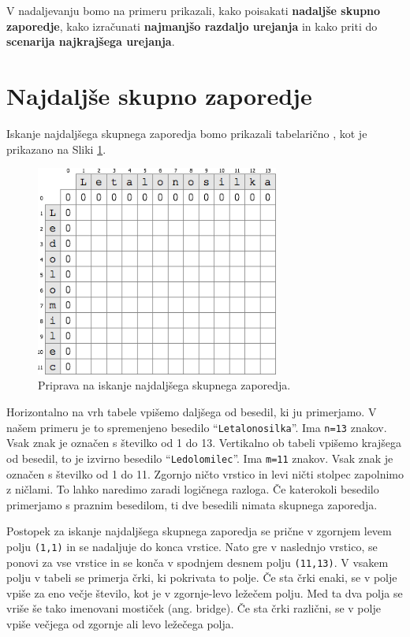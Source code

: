 \documentclass[a4paper, 12pt, twoside]{book}
\begin{document}
V nadaljevanju bomo na primeru prikazali, kako poisakati \textbf{nadaljše skupno zaporedje}, kako izračunati \textbf{najmanjšo razdaljo urejanja} in kako priti do \textbf{scenarija najkrajšega urejanja}.

\section{Najdaljše skupno zaporedje}
\label{sec:lcs}

Iskanje najdaljšega skupnega zaporedja bomo prikazali tabelarično \cite{lcs}, kot je prikazano na Sliki \ref{lcs1}. 

\begin{figure}[placement h]
\begin{center}
\includegraphics[width=8cm]{lcs1.png}
\end{center}
\caption{Priprava na iskanje najdaljšega skupnega zaporedja.}
\label{lcs1}
\end{figure}

Horizontalno na vrh tabele vpišemo daljšega od besedil, ki ju primerjamo. V našem primeru je to spremenjeno besedilo “{\tt Letalonosilka}”. Ima  {\tt n=13} znakov. Vsak znak je označen s številko od 1 do 13. Vertikalno ob tabeli vpišemo krajšega od besedil, to je izvirno besedilo “{\tt Ledolomilec}”. Ima  {\tt m=11} znakov. Vsak znak je označen s številko od 1 do 11. Zgornjo ničto vrstico in levi ničti stolpec zapolnimo z ničlami. To lahko naredimo zaradi logičnega razloga. Če katerokoli besedilo primerjamo s praznim besedilom, ti dve besedili nimata skupnega zaporedja.

Postopek za iskanje najdaljšega skupnega zaporedja se prične v zgornjem levem polju {\tt (1,1)} in se nadaljuje do konca vrstice. Nato gre v naslednjo vrstico, se ponovi za vse vrstice in se konča v spodnjem desnem polju {\tt (11,13)}. V vsakem polju v tabeli se primerja črki, ki pokrivata to polje. Če sta črki enaki, se v polje vpiše za eno večje število, kot je v zgornje-levo ležečem polju. Med ta dva polja se vriše še tako imenovani mostiček (ang. bridge). Če sta črki različni, se v polje vpiše večjega od zgornje ali levo ležečega polja.
\end{document}
